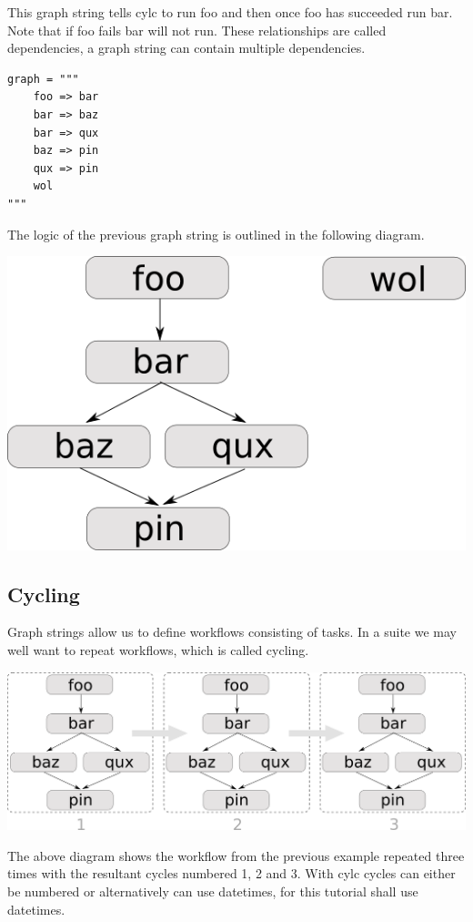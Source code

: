 This graph string tells cylc to run foo and then once foo has succeeded run
bar. Note that if foo fails bar will not run. These relationships are called
dependencies, a graph string can contain multiple dependencies.

\begin{lstlisting}[language=suiterc]
graph = """
    foo => bar
    bar => baz
    bar => qux
    baz => pin
    qux => pin
    wol
"""
\end{lstlisting}


The logic of the previous graph string is outlined in the following diagram.

\begin{center}
    \includegraphics[width=0.4\columnwidth]{resources/tex/cylc-graph}
\end{center}


\subsection{Cycling}

Graph strings allow us to define workflows consisting of tasks. In a suite we
may well want to repeat workflows, which is called cycling.

\begin{center}
    \includegraphics[width=0.6\columnwidth]{resources/tex/cylc-cycle-graph}
\end{center}

The above diagram shows the workflow from the previous example repeated three
times with the resultant cycles numbered 1, 2 and 3. With cylc cycles can
either be numbered or alternatively can use datetimes, for this tutorial shall
use datetimes.

